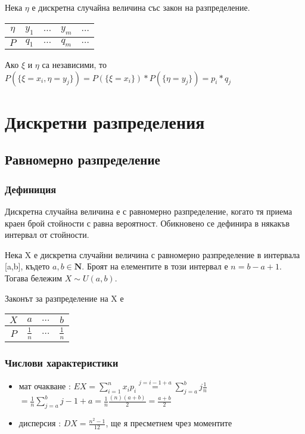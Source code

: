 \documentclass[fleqn,12pt]{article}
\begin{document}
\begin{justify}
Нека $\eta$ е дискретна случайна величина със закон на разпределение.\\
\begin{tabular}{|c|c|c|c|c|}
    \hline
    $\eta$ & $y_1$ & $\dots$ & $y_m$ & $\dots$ \\
    \hline
    $P$ & $q_1$ & $\dots$ & $q_m$ & $\dots$ \\
    \hline
\end{tabular}

Ако $\xi$ и $\eta$ са независими, то $P(\{\xi=x_i,\eta=y_j\}) = P(\{\xi=x_i\})*P(\{\eta=y_j\}) = p_i*q_j$

\section{Дискретни разпределения}
\subsection{Равномерно разпределение}
\subsubsection{Дефиниция} 
Дискретна случайна величина е с равномерно разпределение, когато тя приема краен брой стойности с равна вероятност.
Обикновено се дефинира в някакъв интервал от стойности. 

Нека X е дискретна случайни величина с равномерно разпределение в интервала [a,b], където $a,b \in \mathbf{N}$.
 Броят на елементите в този интервал
е $n = b - a + 1$. Тогава бележим $X \sim U(a, b)$.

Законът за разпределение на X е
\begin{tabular}{|c|c|c|c|}
    \hline
    $X$ & $a$ & $\dots$ & $b$ \\
    \hline
    $P$ & $\frac{1}{n}$ & $\dots$ & $\frac{1}{n}$ \\
    \hline
\end{tabular}

\subsubsection{Числови характеристики} 
\begin{itemize}
    \item мат очакване : $EX = \sum_{i=1}^n x_ip_i \overset{j=i-1+a}{=} \sum_{j=a}^b j \frac{1}{n}$
    $= \frac{1}{n} \sum_{j=a}^b j-1+a = \frac{1}{n} \frac{(n)(a+b)}{2} = \frac{a+b}{2}$
    \item дисперсия : $DX = \frac{n^2 - 1}{12}$, ще я пресметнем чрез моментите
\end{itemize}


\end{justify}
\end{document}
